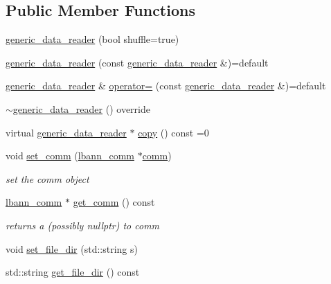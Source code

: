 \subsection*{Public Member Functions}
\begin{DoxyCompactItemize}
\item 
\hyperlink{classlbann_1_1generic__data__reader_aaba933b8f7c1227801f6e80d39986af4}{generic\+\_\+data\+\_\+reader} (bool shuffle=true)
\item 
\hyperlink{classlbann_1_1generic__data__reader_a95d0ca539a613182898ff7693206fb40}{generic\+\_\+data\+\_\+reader} (const \hyperlink{classlbann_1_1generic__data__reader}{generic\+\_\+data\+\_\+reader} \&)=default
\item 
\hyperlink{classlbann_1_1generic__data__reader}{generic\+\_\+data\+\_\+reader} \& \hyperlink{classlbann_1_1generic__data__reader_aec7e626e6efa2a4bf23f931e2ef8f607}{operator=} (const \hyperlink{classlbann_1_1generic__data__reader}{generic\+\_\+data\+\_\+reader} \&)=default
\item 
\hyperlink{classlbann_1_1generic__data__reader_a7ed8e91233268c11b907c5d6667e8a09}{$\sim$generic\+\_\+data\+\_\+reader} () override
\item 
virtual \hyperlink{classlbann_1_1generic__data__reader}{generic\+\_\+data\+\_\+reader} $\ast$ \hyperlink{classlbann_1_1generic__data__reader_a208ba1223e7aaa75e94b728501f12f86}{copy} () const =0
\item 
void \hyperlink{classlbann_1_1generic__data__reader_a39f4d80661a2c8e24d8d167ad5bd6c6b}{set\+\_\+comm} (\hyperlink{classlbann_1_1lbann__comm}{lbann\+\_\+comm} $\ast$\hyperlink{file__io_8cpp_ab048c6f9fcbcfaa57ce68b00263dbebe}{comm})
\begin{DoxyCompactList}\small\item\em set the comm object \end{DoxyCompactList}\item 
\hyperlink{classlbann_1_1lbann__comm}{lbann\+\_\+comm} $\ast$ \hyperlink{classlbann_1_1generic__data__reader_aedca18323a7777180fc12d73d809fb84}{get\+\_\+comm} () const
\begin{DoxyCompactList}\small\item\em returns a (possibly nullptr) to comm \end{DoxyCompactList}\item 
void \hyperlink{classlbann_1_1generic__data__reader_a94a6db0b62d4c98202ef309eb76b220c}{set\+\_\+file\+\_\+dir} (std\+::string s)
\item 
std\+::string \hyperlink{classlbann_1_1generic__data__reader_ab4c6c2d4ba40ece809ce896828c8ff03}{get\+\_\+file\+\_\+dir} () const

\end{DoxyCompactItemize}
